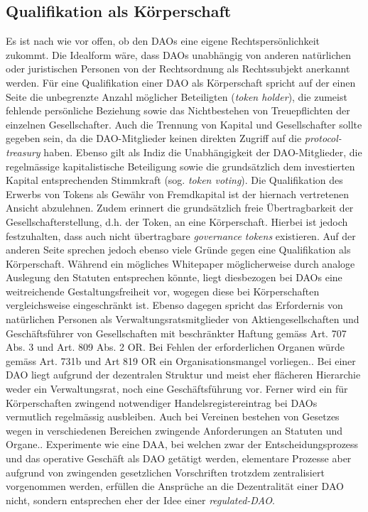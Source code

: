 \documentclass[a4paper,12pt]{report}
\begin{document}
	\subsection{Qualifikation als Körperschaft}
	\startsubsection
    Es ist nach wie vor offen, ob den DAOs eine eigene  Rechtspersönlichkeit zukommt. Die Idealform wäre, dass DAOs unabhängig von anderen natürlichen oder juristischen Personen von der Rechtsordnung als Rechtssubjekt anerkannt werden. Für eine Qualifikation einer DAO als Körperschaft spricht auf der einen Seite die unbegrenzte Anzahl möglicher Beteiligten (\textit{token holder}), die zumeist fehlende persönliche Beziehung sowie das Nichtbestehen von Treuepflichten der einzelnen Gesellschafter. Auch die Trennung von Kapital und Gesellschafter sollte gegeben sein, da die DAO-Mitglieder keinen direkten Zugriff auf die \textit{protocol-treasury} haben. Ebenso gilt als Indiz die Unabhängigkeit der DAO-Mitglieder, die regelmässige kapitalistische Beteiligung sowie die grundsätzlich dem investierten Kapital entsprechenden Stimmkraft (sog. \textit{token voting}).  Die Qualifikation des Erwerbs von Tokens als Gewähr von Fremdkapital ist der hiernach vertretenen Ansicht abzulehnen. Zudem erinnert die grundsätzlich freie Übertragbarkeit der Gesellschafterstellung, d.h. der Token, an eine Körperschaft. Hierbei ist jedoch festzuhalten, dass auch nicht übertragbare \textit{governance tokens} existieren. Auf der anderen Seite sprechen jedoch ebenso viele Gründe gegen eine Qualifikation als Körperschaft. Während ein mögliches Whitepaper möglicherweise durch analoge Auslegung den Statuten entsprechen könnte, liegt diesbezogen bei DAOs eine weitreichende Gestaltungsfreiheit vor, wogegen diese bei Körperschaften vergleichsweise eingeschränkt ist. Ebenso dagegen spricht das Erfordernis von natürlichen Personen als Verwaltungsratsmitglieder von Aktiengesellschaften und Geschäftsführer von Gesellschaften mit beschränkter Haftung gemäss Art. 707 Abs. 3 und Art. 809 Abs. 2 OR. Bei Fehlen der erforderlichen Organen würde gemäss Art. 731b und Art 819 OR ein Organisationsmangel vorliegen.. Bei einer DAO liegt aufgrund der dezentralen Struktur und meist eher flächeren Hierarchie weder ein Verwaltungsrat, noch eine Geschäftsführung vor. Ferner wird ein für Körperschaften zwingend notwendiger Handelsregistereintrag bei DAOs vermutlich regelmässig ausbleiben. Auch bei Vereinen bestehen von Gesetzes wegen in verschiedenen Bereichen zwingende Anforderungen an Statuten und Organe.. Experimente wie eine DAA, bei welchen zwar der Entscheidungsprozess und das operative Geschäft als DAO getätigt werden, elementare Prozesse aber aufgrund von zwingenden gesetzlichen Vorschriften trotzdem zentralisiert vorgenommen werden, erfüllen die Ansprüche an die Dezentralität einer DAO nicht, sondern entsprechen eher der Idee einer \textit{regulated-DAO}.
	\closesection
	
\end{document}
